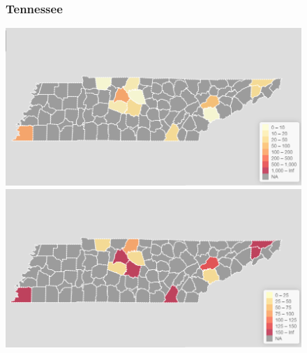 \documentclass[11pt]{article}
\begin{document}
\begin{landscape}
\thispagestyle{empty}
\begin{figure}[h]
\subsubsection*{Tennessee}
\hspace*{-3cm}
\begin{minipage}{.8\textwidth}
    \includegraphics[width=.95\textwidth]{ImageResults/TennesseeTotal.PNG}
\end{minipage}%
\begin{minipage}{.8\textwidth}
    \includegraphics[width=.95\textwidth]{ImageResults/Tennessee100k.PNG}
\end{minipage}

\end{figure}
\end{landscape}
\end{document}
